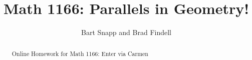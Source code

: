\documentclass[handout,space,nooutcomes]{xourse}
\title{Math 1166: Parallels in Geometry!}
\author{Bart Snapp and Brad Findell}
\begin{document}
\begin{abstract}
Online Homework for Math 1166: Enter via Carmen
\end{abstract}
\maketitle

{}
\end{document}
